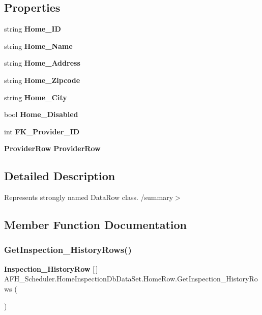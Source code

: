 \subsection*{Properties}
\begin{DoxyCompactItemize}
\item 
string \textbf{ Home\+\_\+\+ID}\hspace{0.3cm}{\ttfamily  [get, set]}
\item 
string \textbf{ Home\+\_\+\+Name}\hspace{0.3cm}{\ttfamily  [get, set]}
\item 
string \textbf{ Home\+\_\+\+Address}\hspace{0.3cm}{\ttfamily  [get, set]}
\item 
string \textbf{ Home\+\_\+\+Zipcode}\hspace{0.3cm}{\ttfamily  [get, set]}
\item 
string \textbf{ Home\+\_\+\+City}\hspace{0.3cm}{\ttfamily  [get, set]}
\item 
bool \textbf{ Home\+\_\+\+Disabled}\hspace{0.3cm}{\ttfamily  [get, set]}
\item 
int \textbf{ F\+K\+\_\+\+Provider\+\_\+\+ID}\hspace{0.3cm}{\ttfamily  [get, set]}
\item 
\textbf{ Provider\+Row} \textbf{ Provider\+Row}\hspace{0.3cm}{\ttfamily  [get, set]}
\end{DoxyCompactItemize}


\subsection{Detailed Description}
Represents strongly named Data\+Row class. /summary$>$ 

\subsection{Member Function Documentation}
\mbox{\label{class_a_f_h___scheduler_1_1_home_inspection_db_data_set_1_1_home_row_a2df1f2155fcd973d78fcd5230e453ee9}} 
\subsubsection{GetInspection\_HistoryRows()}
{\footnotesize\ttfamily \textbf{ Inspection\+\_\+\+History\+Row} [$\,$] A\+F\+H\+\_\+\+Scheduler.\+Home\+Inspection\+Db\+Data\+Set.\+Home\+Row.\+Get\+Inspection\+\_\+\+History\+Rows (\begin{DoxyParamCaption}{ }\end{DoxyParamCaption})}

